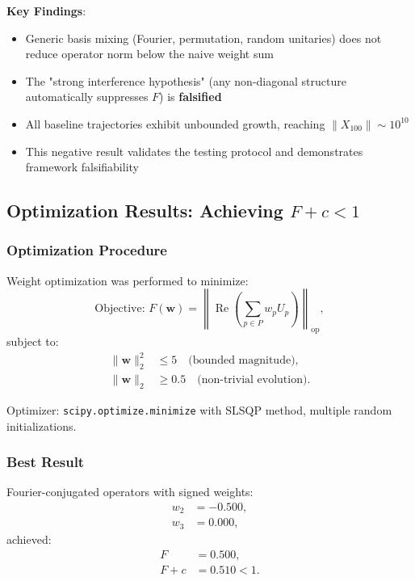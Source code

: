 \documentclass[11pt,a4paper]{article}
\begin{document}
\textbf{Key Findings}:
\begin{itemize}
\item Generic basis mixing (Fourier, permutation, random unitaries) does not reduce operator norm below the naive weight sum
\item The "strong interference hypothesis" (any non-diagonal structure automatically suppresses \(F\)) is \textbf{falsified}
\item All baseline trajectories exhibit unbounded growth, reaching \(\|X_{100}\| \sim 10^{10}\)
\item This negative result validates the testing protocol and demonstrates framework falsifiability
\end{itemize}

\subsection{Optimization Results: Achieving \(F+c<1\)}

\subsubsection{Optimization Procedure}

Weight optimization was performed to minimize:
\[
\text{Objective: } F(\mathbf{w}) = \left\| \operatorname{Re}\left( \sum_{p \in P} w_p U_p \right) \right\|_{\mathrm{op}},
\]
subject to:
\begin{align*}
\|\mathbf{w}\|_2^2 &\leq 5 \quad \text{(bounded magnitude)}, \\
\|\mathbf{w}\|_2 &\geq 0.5 \quad \text{(non-trivial evolution)}.
\end{align*}

Optimizer: \texttt{scipy.optimize.minimize} with SLSQP method, multiple random initializations.

\subsubsection{Best Result}

Fourier-conjugated operators with signed weights:
\begin{align*}
w_2 &= -0.500, \\
w_3 &= 0.000,
\end{align*}
achieved:
\begin{align*}
F &= 0.500, \\
F + c &= 0.510 < 1.
\end{align*}
\end{document}
